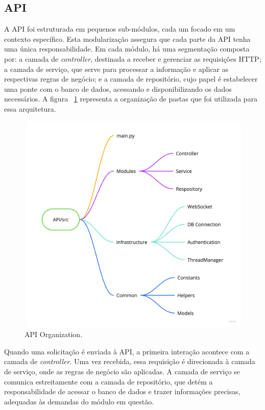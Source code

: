\subsection{API}\label{subsec:apiArchitecture}
A API foi estruturada em pequenos sub-módulos, cada um focado em um contexto específico. Esta modularização assegura que cada parte da API tenha uma única responsabilidade. Em cada módulo, há uma segmentação composta por: a camada de \textit{controller}, destinada a receber e gerenciar as requisições HTTP; a camada de serviço, que serve para processar a informação e aplicar as respectivas regras de negócio; e a camada de repositório, cujo papel é estabelecer uma ponte com o banco de dados, acessando e disponibilizando os dados necessários. A figura ~\ref{fig:api_organization} representa a organização de pastas que foi utilizada para essa arquitetura.

\begin{figure}[htbp]
	\centering
	\includegraphics[width=\textwidth]{images/API_Organization.jpg}
	\caption{API Organization.}
	\label{fig:api_organization}
\end{figure}

Quando uma solicitação é enviada à API, a primeira interação acontece com a camada de \textit{controller}. Uma vez recebida, essa requisição é direcionada à camada de serviço, onde as regras de negócio são aplicadas. A camada de serviço se comunica estreitamente com a camada de repositório, que detém a responsabilidade de acessar o banco de dados e trazer informações precisas, adequadas às demandas do módulo em questão.

